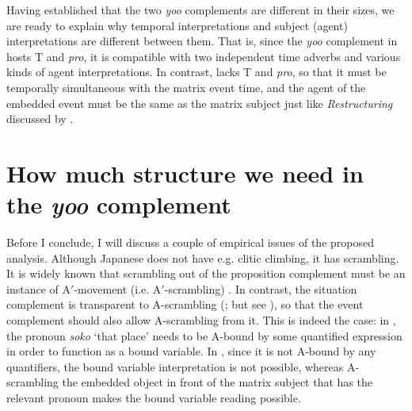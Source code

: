 \documentclass[output=paper]{langsci/langscibook}
\begin{document}
\ea\label{shimamu28}
\begin{xlist} 
\end{xlist}
\z 
Having established that the two \textit{yoo} complements are different in their sizes, we are ready to explain why temporal interpretations and subject (agent) interpretations are different between them. That is, since the \textit{yoo} complement in  hosts T and \textit{pro}, it is compatible with two independent time adverbs and various kinds of agent interpretations. In contrast,  lacks T and \textit{pro}, so that it must be temporally simultaneous with the matrix event time, and the agent of the embedded event must be the same as the matrix subject just like \textit{Restructuring} discussed by \citet{wurmbrand2001}.

\section{How much structure we need in the \textit{yoo} complement}\label{shimamuS5}
Before I conclude, I will discuss a couple of empirical issues of the proposed analysis. Although Japanese does not have e.g. clitic climbing, it has scrambling. It is widely known that scrambling out of the proposition complement must be an instance of A$'$-movement (i.e. A$'$-scrambling) \citep[][among many others]{saito1992}. In contrast, the situation complement is transparent to A-scrambling (\citealt{nemoto1991}; but see \citealt{takano2010}), so that the event complement should also allow A-scrambling from it. This is indeed the case: in , the pronoun \textit{soko} `that place' needs to be A-bound by some quantified expression in order to function as a bound variable. In , since it is not A-bound by any quantifiers, the bound variable interpretation is not possible, whereas A-scrambling the embedded object in front of the matrix subject that has the relevant pronoun makes the bound variable reading possible.
\end{document}
